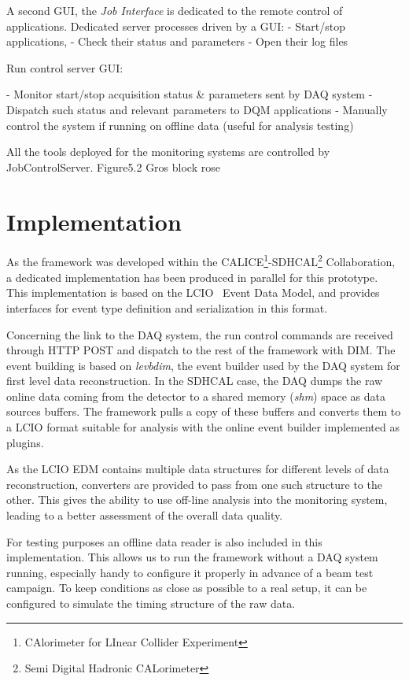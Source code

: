 \documentclass[conference]{IEEEtran}
\begin{document}
A second GUI, the \textit{Job Interface} is dedicated to the remote control of applications.
Dedicated server processes driven by a GUI:
- Start/stop applications,
- Check their status and parameters
- Open their log files

Run control server GUI:

- Monitor start/stop acquisition status & parameters sent by DAQ system
- Dispatch such status and relevant parameters to DQM applications
- Manually control the system if running on offline data (useful for analysis testing)


All the tools deployed for the monitoring systems are controlled by JobControlServer.
Figure5.2 Gros block rose





\section{Implementation}

As the framework was developed within the CALICE\footnote{CAlorimeter for LInear Collider Experiment}-SDHCAL\footnote{Semi Digital Hadronic CALorimeter} Collaboration, a dedicated implementation has been produced in parallel for this prototype. This implementation is based on the LCIO~\cite{LCIO} Event Data Model, and provides interfaces for event type definition and serialization in this format.


Concerning the link to the DAQ system, the run control commands are received through HTTP POST and dispatch to the rest of the framework with DIM. The event building is based on \textit{levbdim}, the event builder used by the DAQ system for first level data reconstruction. In the SDHCAL case, the DAQ dumps the raw online data coming from the detector to a shared memory (\textit{shm}) space as data sources buffers. The framework pulls a copy of these buffers and converts them to a LCIO format suitable for analysis with the online event builder implemented as plugins.

As the LCIO EDM contains multiple data structures for different levels of data reconstruction, converters are provided to pass from one such structure to the other. This gives the ability to use off-line analysis into the monitoring system, leading to a better assessment of the overall data quality.

For testing purposes an offline data reader is also included in this implementation. This allows us to run the framework without a DAQ system running, especially handy to configure it properly in advance of a beam test campaign. To keep conditions as close as possible to a real setup, it can be configured to simulate the timing structure of the raw data.
\end{document}
